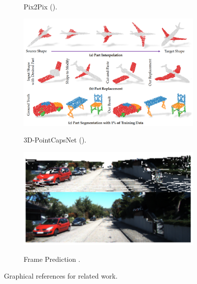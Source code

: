 \documentclass{article}
\begin{document}
\begin{figure}[h!]
\begin{subfigure}{0.45\textwidth}
\begin{center}
\begin{minipage}[t]{0.95\linewidth}
\begin{centering}
\caption{Pix2Pix (\cite{image_to_image}).}
\label{fig:image_to_image}
\end{centering}
\end{minipage}
\end{center}
\end{subfigure}
\begin{subfigure}{0.45\textwidth}
\begin{center}
\begin{minipage}[t]{0.925\linewidth}
\begin{centering}
{\includegraphics[width=\linewidth]{capsules.png}}
\caption{3D-PointCapsNet (\cite{3D_capsule_networks}).}
\label{fig:3D_capsule_networks}
\end{centering}
\end{minipage}
\end{center}
\end{subfigure}
\begin{subfigure}{0.45\textwidth}
\begin{center}
\begin{minipage}[t]{0.95\linewidth}
\begin{centering}
{\includegraphics[width=\linewidth]{frame_prediction.png}}
\caption{Frame Prediction \cite{frame_prediction}.}
\label{fig:frame_prediction}
\end{centering}
\end{minipage}
\end{center}
\end{subfigure}
\caption{Graphical references for related work.}
\label{fig:related_work}
\end{figure}
\end{document}
